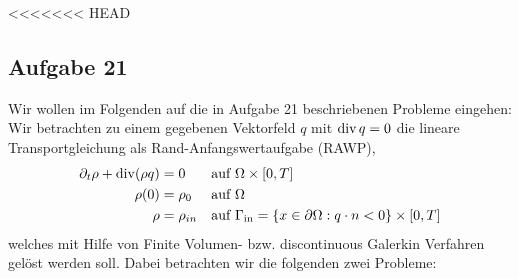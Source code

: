 <<<<<<< HEAD



\newpage
\subsection{Aufgabe 21}

Wir wollen im Folgenden auf die in Aufgabe 21 beschriebenen Probleme eingehen:
Wir betrachten zu einem gegebenen Vektorfeld $q$ mit $ \operatorname{div} q = 0$ die lineare Transportgleichung als Rand-Anfangswertaufgabe (RAWP),
\begin{align*}
 	\partial_t \rho + \operatorname{div} (\rho q) &= 0  &&\text{auf }\Omega \times [0,T] \\
 	\rho(0) &= \rho_0   &&\text{auf } \Omega \\
 	\rho &= \rho_{in}  &&\text{auf } \Gamma_{{\text{in}}} = \{ x \in \partial \Omega: q \cdot n < 0 \} \times [0,T]
\end{align*}
welches mit Hilfe von Finite Volumen- bzw. discontinuous Galerkin Verfahren gelöst werden soll. Dabei betrachten wir die folgenden zwei Probleme:

